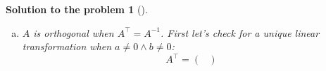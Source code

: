 \documentclass[12pt,a4]{article}
\newtheorem{solution}{Solution to the problem}
\newcommand{\bu}{{\mathbf u}}
\newcommand{\bv}{{\mathbf v}}
\begin{document}
\begin{solution}[]
\begin{enumerate}[(a)]
\[
P_{u \to e} = 
\begin{pmatrix}
1 &  1 & 0 \\
0  & a & 1 \\
0  & 0 & b \\
\end{pmatrix} \qquad
A_{ve} = 
\begin{pmatrix}
0 &  0 & a \\
0  & b & 1 \\
1  & 1 & 0 \\
\end{pmatrix}
\]
We need to find $A = A_e$:
\[
A_e = A_{ve} P_{e \to u} = A_{ve} P_{u \to e}^{-1}
\]
\[
\det P_{u \to e} = ab \qquad
P_{u \to e}^{-1} = \frac{1}{ab}
\begin{pmatrix}
ab & -b &  1 \\
0  &  b & -1 \\
0  &  0 &  a \\
\end{pmatrix}
\]
\[
\Rightarrow
A_e = \frac{1}{ab}
\begin{pmatrix}
0 &  0 & a \\
0  & b & 1 \\
1  & 1 & 0 \\
\end{pmatrix}
\begin{pmatrix}
ab & -b &  1 \\
0  &  b & -1 \\
0  &  0 &  a \\
\end{pmatrix} = \frac{1}{ab}
\begin{pmatrix}
0 &  0 & a^2 \\
0  & b^2 & a-b \\
ab  & 0 & 0 \\
\end{pmatrix} = 
\begin{pmatrix}
0 &  0 & \frac{a}{b} \\
0  & \frac{b}{a} & \frac{a-b}{ab} \\
1  & 0 & 0 \\
\end{pmatrix} 
\]
One can see that indeed $\forall i=\overline{1,3} \quad A_e \bu_i = \bv_i $. So the answer is $a \neq 0 \wedge b \neq 0$.\\[5pt]
\item $A$ is orthogonal when $A^\top = A^{-1}$. First let's check for a unique linear transformation when $a \neq 0 \wedge b \neq 0$:
\[
A^\top = \begin{pmatrix}

\end{pmatrix}\]
\end{enumerate}
\end{solution}
\end{document}
